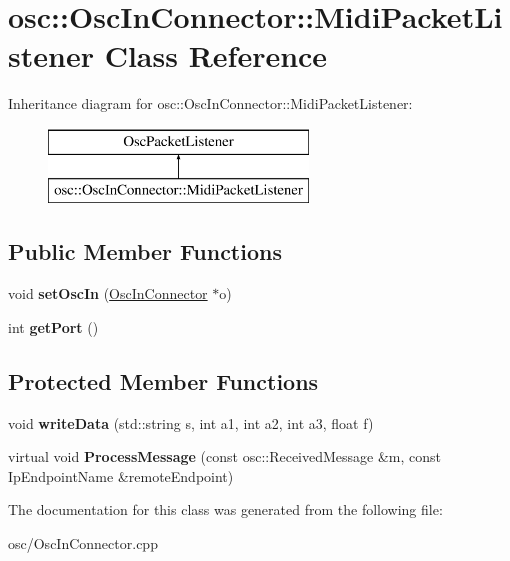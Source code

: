 \hypertarget{classOscInConnector_1_1MidiPacketListener}{}\section{osc\+:\+:Osc\+In\+Connector\+:\+:Midi\+Packet\+Listener Class Reference}
\label{classOscInConnector_1_1MidiPacketListener}
Inheritance diagram for osc\+:\+:Osc\+In\+Connector\+:\+:Midi\+Packet\+Listener\+:\begin{figure}[H]
\begin{center}
\leavevmode
\includegraphics[height=2.000000cm]{classOscInConnector_1_1MidiPacketListener}
\end{center}
\end{figure}
\subsection*{Public Member Functions}
\begin{DoxyCompactItemize}
\item 
void {\bfseries set\+Osc\+In} (\hyperlink{classosc_1_1OscInConnector}{Osc\+In\+Connector} $\ast$o)\hypertarget{classOscInConnector_1_1MidiPacketListener_a184cd179631e0405cf51fc9d5787ad68}{}\label{classOscInConnector_1_1MidiPacketListener_a184cd179631e0405cf51fc9d5787ad68}

\item 
int {\bfseries get\+Port} ()\hypertarget{classOscInConnector_1_1MidiPacketListener_af32366a75578da1b15ecb54beb7633e5}{}\label{classOscInConnector_1_1MidiPacketListener_af32366a75578da1b15ecb54beb7633e5}

\end{DoxyCompactItemize}
\subsection*{Protected Member Functions}
\begin{DoxyCompactItemize}
\item 
void {\bfseries write\+Data} (std\+::string s, int a1, int a2, int a3, float f)\hypertarget{classOscInConnector_1_1MidiPacketListener_afd16b4451a05a986f23a084d0414b1a4}{}\label{classOscInConnector_1_1MidiPacketListener_afd16b4451a05a986f23a084d0414b1a4}

\item 
virtual void {\bfseries Process\+Message} (const osc\+::\+Received\+Message \&m, const Ip\+Endpoint\+Name \&remote\+Endpoint)\hypertarget{classOscInConnector_1_1MidiPacketListener_a5fa1f1bee930939a8a3a0f127eda5a35}{}\label{classOscInConnector_1_1MidiPacketListener_a5fa1f1bee930939a8a3a0f127eda5a35}

\end{DoxyCompactItemize}


The documentation for this class was generated from the following file\+:\begin{DoxyCompactItemize}
\item 
osc/Osc\+In\+Connector.\+cpp\end{DoxyCompactItemize}
